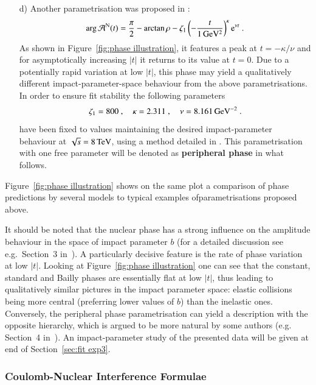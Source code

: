 \begin{enumerate}
\item[d)]
Another parametrisation was proposed in \cite{kl94}:
\begin{equation}
\label{eq:nuc phase per}
\arg {\cal A}^{\rm N}(t) = {\pi\over 2} - \arctan\rho - \zeta_1 \left(- {t\over 1\un{GeV^2}} \right)^\kappa \e^{\nu t}\ .
\end{equation}
As shown in Figure~\ref{fig:phase illustration}, it features a peak at $t = -\kappa / \nu$ and for asymptotically increasing $|t|$ it returns to its value at $t=0$. Due to a potentially rapid variation at low $|t|$, this phase may yield a qualitatively different impact-parameter-space behaviour from the above parametrisations. In order to ensure fit stability the following parameters
\begin{equation}
\label{eq:nuc phase per val}
	\zeta_1 = 800\ ,\quad
	\kappa = 2.311\ ,\quad
	\nu = 8.161\,{\rm GeV^{-2}}\ .
\end{equation}
have been fixed to values maintaining the desired impact-parameter behaviour at $\sqrt s = 8\,{\rm TeV}$, using a method detailed in \cite{pk16}. This parametrisation with one free parameter will be denoted as {\bf peripheral phase} in what follows.

\end{enumerate}

Figure~\ref{fig:phase illustration} shows on the same plot a comparison of phase predictions by several models to typical examples of\Break parametrisations proposed above.

It should be noted that the nuclear phase has a strong influence on the amplitude behaviour in the space of impact parameter $b$ (for a detailed discussion see e.g.~Section~3 in~\cite{klk02}). A particularly decisive feature is the rate of phase variation at low $|t|$. Looking at Figure~\ref{fig:phase illustration} one can see that the constant, standard and Bailly phases are essentially flat at low $|t|$, thus leading to qualitatively similar pictures in the impact parameter space: elastic collisions being more central (preferring lower values of $b$) than the inelastic ones. Conversely, the peripheral phase parametrisation can yield a description with the opposite hierarchy, which is argued to be more natural by some authors (e.g. Section~4 in~\cite{kl96}). An impact-parameter study of the presented data will be given at end of Section~\ref{sec:fit exp3}.

\subsubsection{Coulomb-Nuclear Interference Formulae}
\label{sec:cni interference}


